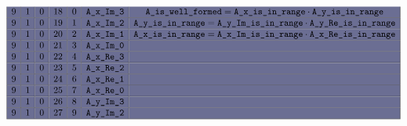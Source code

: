\begin{figure}[h!]
\begin{adjustwidth}{-2cm}{-2cm}
{\[\begin{array}{|c|c|c|c|c|c|c|}
       \rowcolor{mybackground} 9 & 1      & 0      & 18          & 0         & \locAXImThree              & \locAIsWellFormed = \locAXIsInRange   \cdot \locAYIsInRange                                                                   \\ \hline
       \rowcolor{mybackground} 9 & 1      & 0      & 19          & 1         & \locAXImTwo                & \locAYIsInRange =   \locAYImIsInRange \cdot \locAYReIsInRange                                                                 \\ \hline
       \rowcolor{mybackground} 9 & 1      & 0      & 20          & 2         & \locAXImOne                & \locAXIsInRange =   \locAXImIsInRange \cdot \locAXReIsInRange                                                                 \\ \hline
       \rowcolor{mybackground} 9 & 1      & 0      & 21          & 3         & \locAXImZero               &                                                                                                                               \\ \hline
       \rowcolor{mybackground} 9 & 1      & 0      & 22          & 4         & \locAXReThree              &                                                                                                                               \\ \hline
       \rowcolor{mybackground} 9 & 1      & 0      & 23          & 5         & \locAXReTwo                &                                                                                                                               \\ \hline
       \rowcolor{mybackground} 9 & 1      & 0      & 24          & 6         & \locAXReOne                &                                                                                                                               \\ \hline
       \rowcolor{mybackground} 9 & 1      & 0      & 25          & 7         & \locAXReZero               &                                                                                                                               \\ \hline
       \rowcolor{mybackground} 9 & 1      & 0      & 26          & 8         & \locAYImThree              &                                                                                                                               \\ \hline
       \rowcolor{mybackground} 9 & 1      & 0      & 27          & 9         & \locAYImTwo                &                                                                                                                               \\ \hline

\end{array}\]}
\end{adjustwidth}
\end{figure}
